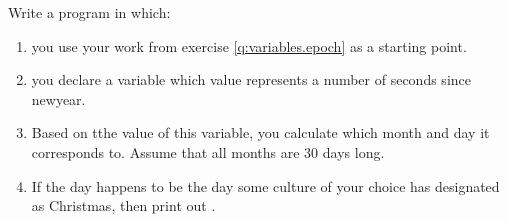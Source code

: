 \label{q:branches.epoch}

Write a program in which:

\begin{enumerate}
  \item you use your work from exercise \ref{q:variables.epoch} as a starting point.
  \item you declare a variable which value represents a number of seconds since newyear.
  \item Based on tthe value of this variable, you calculate which month and day it corresponds to. Assume that all months are 30 days long.
  \item If the day happens to be the day some culture of your choice has designated as Christmas, then print out .
\end{enumerate}
